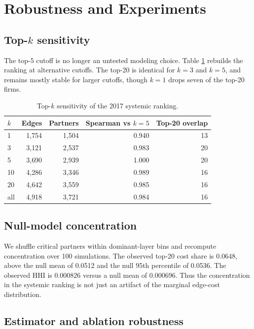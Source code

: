 \documentclass[11pt,letterpaper]{article}
\begin{document}
\section{Robustness and Experiments}
\label{sec:robustness}

\subsection{\texorpdfstring{Top-$k$ sensitivity}{Top-k sensitivity}}

The top-5 cutoff is no longer an untested modeling choice.  Table
\ref{tab:topk} rebuilds the ranking at alternative cutoffs.  The
top-20 is identical for $k=3$ and $k=5$, and remains mostly stable for
larger cutoffs, though $k=1$ drops seven of the top-20 firms.

\begin{table}[H]
\centering
\footnotesize
\caption{Top-$k$ sensitivity of the 2017 systemic ranking.}
\label{tab:topk}
\begin{tabular}{lrrrr}
\toprule
$k$ & Edges & Partners & Spearman vs $k=5$ & Top-20 overlap \\
\midrule
1   & 1{,}754 & 1{,}504 & 0.940 & 13 \\
3   & 3{,}121 & 2{,}537 & 0.983 & 20 \\
5   & 3{,}690 & 2{,}939 & 1.000 & 20 \\
10  & 4{,}286 & 3{,}346 & 0.989 & 16 \\
20  & 4{,}642 & 3{,}559 & 0.985 & 16 \\
all & 4{,}918 & 3{,}721 & 0.984 & 16 \\
\bottomrule
\end{tabular}
\end{table}

\subsection{Null-model concentration}

We shuffle critical partners within dominant-layer bins and recompute
concentration over 100 simulations.  The observed top-20 cost share is
0.0648, above the null mean of 0.0512 and the null 95th percentile of
0.0536.  The observed HHI is 0.000826 versus a null mean of 0.000696.
Thus the concentration in the systemic ranking is not just an artifact
of the marginal edge-cost distribution.

\subsection{Estimator and ablation robustness}
\end{document}
